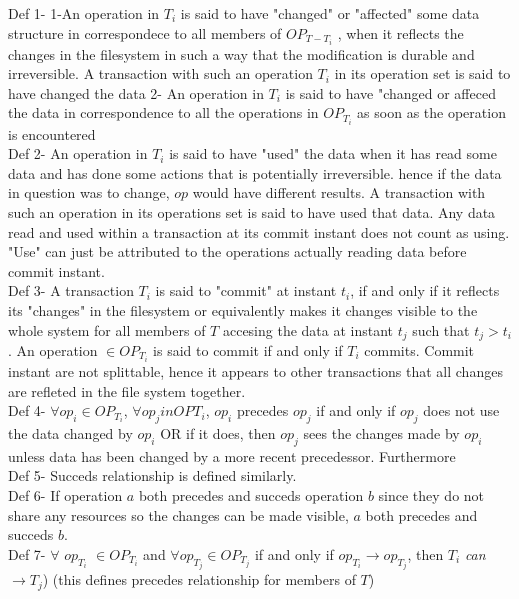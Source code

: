 \documentclass[a4paper, 11pt]{article}
\begin{document}
Def 1- 1-An operation in $T_i$ is said to have "changed" or "affected" some data structure in correspondece to all members of $OP_{T- T_i}$ , when it reflects the changes in the filesystem in such a way that the modification is durable and irreversible. A transaction with such an operation $T_i$ in its operation set is said to have changed the data 2- An operation in $T_i$ is said to have "changed or affeced the data in correspondence to all the operations in $OP_{T_i}$ as soon as the operation is encountered \\

Def 2- An operation in $T_i$ is said to have "used" the data when it has read some data and has done some actions that is potentially irreversible. hence if the data in question was to change, $op$ would have different results. A transaction with such an operation in its operations set is said to have used that data. Any data read and used within a transaction at its commit instant does not count as using. "Use" can just be attributed to the operations actually reading data before commit instant. \\   

Def 3- A transaction $T_i$ is said to "commit" at instant $t_i$, if and only if it reflects its "changes" in the filesystem or equivalently makes it changes visible to the whole system for all members of $T$ accesing the data at instant $t_j$ such that $t_j > t_i$ . An operation $\in OP_{T_i}$ is said to commit if and only if $T_i$ commits. Commit instant are not splittable, hence it appears to other transactions that all changes are refleted in the file system together.\\ 

Def 4-  $\forall op_i \in OP_{T_i}$, $\forall op_j in OP{T_i}$, $op_i$ precedes $op_j$ if and only if $op_j$ does not use the data changed by $op_i$ OR if it does, then $op_j$ sees the changes made by $op_i$ unless data has been changed by a more recent precedessor. Furthermore  \\ 

Def 5- Succeds relationship is defined similarly.  \\

Def 6- If operation $a$ both precedes and succeds operation $b$ since they do not share any resources so the changes can be made visible, $a$ both precedes and succeds $b$. \\ 

Def 7- $\forall$ $op_{T_i}$ $\in OP_{T_i}$ and $\forall op_{T_j}\in OP_{T_j}$ if and only if $op_{T_i} \rightarrow op_{T_j}$,  then $T_i$ \emph {can} $\rightarrow T_j$) \hspace{8mm} (this defines precedes relationship for members of $T$) \\
\end{document}
